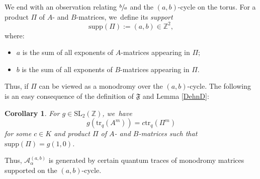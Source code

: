 \documentclass[11pt]{article}
\newcommand{\SL}{\mathrm{SL}}
\newtheorem{cor}[thm]{Corollary}
\theoremstyle{definition}
\newcommand{\ZZ}{\mathbb{Z}}
\newcommand{\AAA}{\mathcal{A}}
\newcommand{\tr}{\mathrm{tr}}
\begin{document}
We end with an observation relating $\sfrac{b}{a}$ and the $(a,b)$-cycle on the torus.
For a product $\Pi$ of $A$- and $B$-matrices, we~define its \textit{support}
\[
\mathrm{supp}(\Pi):=(a,b)\in\ZZ^2,
\]
where:
\begin{itemize}
\item $a$ is the sum of all exponents of $A$-matrices appearing in $\Pi$;
\item $b$ is the sum of all exponents of $B$-matrices appearing in $\Pi$.
\end{itemize}
Thus, if $\Pi$ can be viewed as a monodromy over the $(a,b)$-cycle.
The following is an easy consequence of the definition of $\mathfrak{F}$ and Lemma \ref{DehnD}:

\begin{cor}
For $g\in \SL_2(\ZZ)$, we~have
\[
g\left(\tr_q(A^m) \right)=c\tr_q(\Pi^m)
\]
for some $c\in K$ and product $\Pi$ of $A$- and $B$-matrices such that $\mathrm{supp}(\Pi)=g(1,0)$.
\end{cor}
Thus, $\AAA_\alpha^{(a,b)}$ is generated by certain quantum traces of monodromy matrices supported on the $(a,b)$-cycle.

\end{document}
